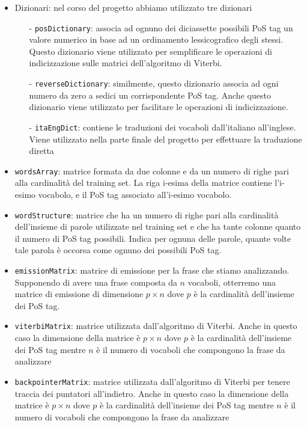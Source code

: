 \documentclass[10pt]{article}
\begin{document}
\begin{itemize}
	\item Dizionari: nel corso del progetto abbiamo utilizzato tre dizionari
	\begin{itemize}
		\item[-] \texttt{posDictionary}: associa ad ognuno dei diciassette possibili PoS tag un valore numerico in base ad un ordinamento lessicografico degli stessi. Questo dizionario viene utilizzato per semplificare le operazioni di indicizzazione sulle matrici dell'algoritmo di Viterbi.
		\item[-] \texttt{reverseDictionary}: similmente, questo dizionario associa ad ogni numero da zero a sedici un corrispondente PoS tag. Anche questo dizionario viene utilizzato per facilitare le operazioni di indicizzazione.
		\item[-] \texttt{itaEngDict}: contiene le traduzioni dei vocaboli dall'italiano all'inglese. Viene utilizzato nella parte finale del progetto per effettuare la traduzione diretta
	\end{itemize}
	
	\item \texttt{wordsArray}: matrice formata da due colonne e da un numero di righe pari alla cardinalità del training set. La riga i-esima della matrice contiene l'i-esimo vocabolo, e il PoS tag associato all'i-esimo vocabolo.
	
	\item \texttt{wordStructure}: matrice che ha un numero di righe pari alla cardinalità dell'insieme di parole utilizzate nel training set e che ha tante colonne quanto il numero di PoS tag possibili. Indica per ognuna delle parole, quante volte tale parola è occorsa come ognuno dei possibili PoS tag.
	
	\item \texttt{emissionMatrix}: matrice di emissione per la frase che stiamo analizzando. Supponendo di avere una frase composta da $n$ vocaboli, otterremo una matrice di emissione di dimensione $p \times n$ dove $p$ è la cardinalità dell'insieme dei PoS tag.
	
	\item \texttt{viterbiMatrix}: matrice utilizzata dall'algoritmo di Viterbi. Anche in questo caso la dimensione della matrice è $p \times n$ dove $p$ è la cardinalità dell'insieme dei PoS tag mentre $n$ è il numero di vocaboli che compongono la frase da analizzare
	
	\item \texttt{backpointerMatrix}: matrice utilizzata dall'algoritmo di Viterbi per tenere traccia dei puntatori all'indietro. Anche in questo caso la dimensione della matrice è $p \times n$ dove $p$ è la cardinalità dell'insieme dei PoS tag mentre $n$ è il numero di vocaboli che compongono la frase da analizzare
	

\end{itemize}
\end{document}
